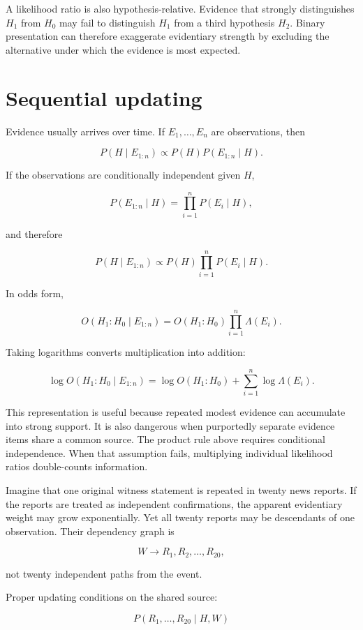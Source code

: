 A likelihood ratio is also hypothesis-relative. Evidence that strongly distinguishes \(H_1\) from \(H_0\) may fail to distinguish \(H_1\) from a third hypothesis \(H_2\). Binary presentation can therefore exaggerate evidentiary strength by excluding the alternative under which the evidence is most expected.

\section{Sequential updating}
\label{sec:a7}

Evidence usually arrives over time. If \(E_1,\ldots,E_n\) are observations, then

\[
P(H\mid E_{1:n})
\propto
P(H)P(E_{1:n}\mid H).
\]

If the observations are conditionally independent given \(H\),

\[
P(E_{1:n}\mid H)
=
\prod_{i=1}^{n}P(E_i\mid H),
\]

and therefore

\[
P(H\mid E_{1:n})
\propto
P(H)\prod_{i=1}^{n}P(E_i\mid H).
\]

In odds form,

\[
O(H_1:H_0\mid E_{1:n})
=
O(H_1:H_0)
\prod_{i=1}^{n}
\Lambda(E_i).
\]

Taking logarithms converts multiplication into addition:

\[
\log O(H_1:H_0\mid E_{1:n})
=
\log O(H_1:H_0)
+
\sum_{i=1}^{n}\log\Lambda(E_i).
\]

This representation is useful because repeated modest evidence can accumulate into strong support. It is also dangerous when purportedly separate evidence items share a common source. The product rule above requires conditional independence. When that assumption fails, multiplying individual likelihood ratios double-counts information.

Imagine that one original witness statement is repeated in twenty news reports. If the reports are treated as independent confirmations, the apparent evidentiary weight may grow exponentially. Yet all twenty reports may be descendants of one observation. Their dependency graph is

\[
W\longrightarrow
R_1,R_2,\ldots,R_{20},
\]

not twenty independent paths from the event.

Proper updating conditions on the shared source:

\[
P(R_1,\ldots,R_{20}\mid H,W)
\]


